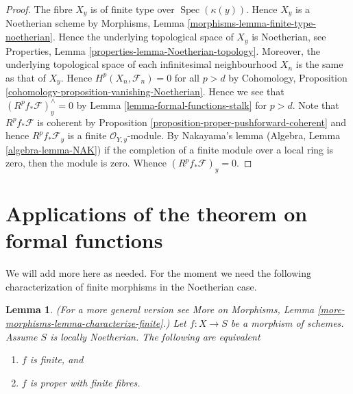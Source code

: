 \documentclass{stacks-project}
\theoremstyle{plain}
\newtheorem{lemma}[subsection]{Lemma}
\theoremstyle{definition}
\theoremstyle{remark}
\numberwithin{equation}{subsection}
\def\Spec{\mathop{\mathrm{Spec}}}
\begin{document}
\begin{proof}
The fibre $X_y$ is of finite type over $\Spec(\kappa(y))$.
Hence $X_y$ is a Noetherian scheme by
Morphisms, Lemma \ref{morphisms-lemma-finite-type-noetherian}.
Hence the underlying topological space of $X_y$ is Noetherian, see
Properties, Lemma \ref{properties-lemma-Noetherian-topology}.
Moreover, the underlying topological space of each infinitesimal
neighbourhood $X_n$ is the same as that of $X_y$.
Hence $H^p(X_n, \mathcal{F}_n) = 0$ for all $p > d$ by
Cohomology, Proposition \ref{cohomology-proposition-vanishing-Noetherian}.
Hence we see that $(R^pf_*\mathcal{F})_y^\wedge = 0$
by Lemma \ref{lemma-formal-functions-stalk} for $p > d$.
Note that $R^pf_*\mathcal{F}$ is coherent by
Proposition \ref{proposition-proper-pushforward-coherent} and
hence $R^pf_*\mathcal{F}_y$ is a finite
$\mathcal{O}_{Y, y}$-module. By Nakayama's lemma
(Algebra, Lemma \ref{algebra-lemma-NAK})
if the completion of a finite module over a local ring
is zero, then the module is zero. Whence
$(R^pf_*\mathcal{F})_y = 0$.
\end{proof}








\section{Applications of the theorem on formal functions}
\label{section-applications-formal-functions}


\noindent
We will add more here as needed. For the moment we need the
following characterization of finite morphisms in the Noetherian case.

\begin{lemma}
\label{lemma-characterize-finite}
(For a more general version see
More on Morphisms, Lemma \ref{more-morphisms-lemma-characterize-finite}.)
Let $f : X \to S$ be a morphism of schemes.
Assume $S$ is locally Noetherian.
The following are equivalent
\begin{enumerate}
\item $f$ is finite, and
\item $f$ is proper with finite fibres.
\end{enumerate}
\end{lemma}
\end{document}
